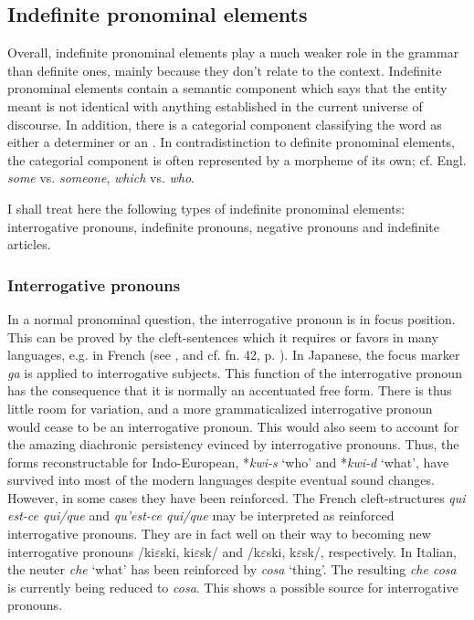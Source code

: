 \subsection{Indefinite pronominal elements}

Overall, indefinite pronominal elements play a much weaker role in the grammar than definite ones, mainly because they don't relate to the context. Indefinite pronominal elements contain a semantic component which says that the entity meant is not identical with anything established in the current universe of discourse. In addition, there is a categorial component classifying the word as either a determiner or an \np. In contradistinction to definite pronominal elements, the categorial component is often represented by a morpheme of its own; cf. Engl. \textit{some} vs. \textit{someone}, \textit{which} vs. \textit{who}.

I shall treat here the following types of indefinite pronominal elements: interrogative pronouns, indefinite pronouns, negative pronouns and indefinite articles.

\subsubsection{Interrogative pronouns}
In a normal pronominal question, the interrogative pronoun is in focus position. This can be proved by the cleft-sentences which it requires or favors in many languages, e.g. in French (see \citealt{Sasse1977b}, and cf. fn. 42, p. \pageref{page125}\chk%
). In Japanese, the focus marker \textit{ga} is applied to interrogative subjects. This function of the interrogative pronoun has the consequence that it is normally an accentuated free form. There is thus little room for variation, and a more grammaticalized interrogative pronoun would cease to be an interrogative pronoun. This would also seem to account for the amazing diachronic persistency evinced by interrogative pronouns. Thus, the forms reconstructable for Indo-European, *\textit{kwi-s} ‘who’ and *\textit{kwi-d} ‘what’, have survived into most of the modern languages despite eventual sound changes. However, in some cases they have been reinforced. The French cleft-structures \textit{qui est-ce qui/que} and \textit{qu'est-ce qui/que} may be interpreted as reinforced interrogative pronouns. They are in fact well on their way to becoming new interrogative pronouns /ki$\varepsilon $ski, ki$\varepsilon $sk/ and /k$\varepsilon $ski, k$\varepsilon $sk/, respectively. In Italian, the neuter \textit{che} ‘what’ has been reinforced by \textit{cosa} ‘thing’. The resulting \textit{che cosa} is currently being reduced to \textit{cosa}. This shows a possible source for interrogative pronouns.

